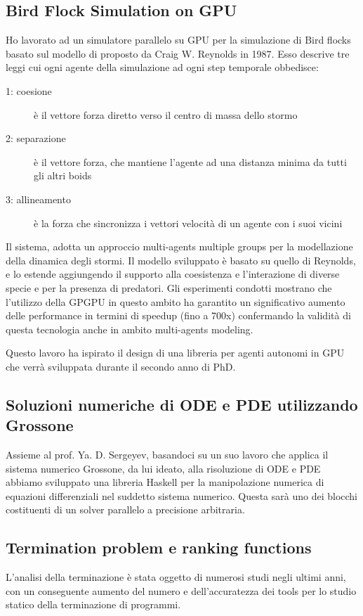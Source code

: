 \documentclass[a4paper]{article}
\begin{document}
  \subsection{Bird Flock Simulation on GPU}
  Ho lavorato ad un simulatore parallelo su GPU per la simulazione di Bird
  flocks basato sul modello di proposto da Craig W. Reynolds in 1987. Esso
  descrive tre leggi cui ogni agente della simulazione ad ogni step
  temporale obbedisce:
  \begin{description}
    \item[1: coesione] è il vettore forza diretto verso il centro di massa dello
    stormo 
    \item [2: separazione]  è il vettore forza, che mantiene l'agente ad una
    distanza minima da tutti gli altri boids
    \item [3: allineamento] è la forza che sincronizza i vettori velocità di un
    agente con i suoi vicini
  \end{description}
  
  Il sistema, adotta un approccio multi-agents multiple
  groups per la modellazione della dinamica degli stormi. Il modello sviluppato
  è basato su quello di Reynolds, e lo estende aggiungendo il supporto alla
  coesistenza e l'interazione di diverse specie e per la presenza di predatori.
Gli esperimenti condotti mostrano che l'utilizzo della GPGPU in questo ambito ha
garantito un significativo aumento delle performance in termini di speedup
(fino a 700x) confermando la validità di questa tecnologia anche in ambito
multi-agents modeling. 

Questo lavoro ha ispirato il design di una libreria per
agenti autonomi in GPU che verrà sviluppata durante il secondo anno di PhD.
  
 	\subsection{Soluzioni numeriche di ODE e PDE utilizzando Grossone}
  	Assieme al prof. Ya. D. Sergeyev, basandoci su un suo lavoro che applica il
  	sistema numerico Grossone, da lui ideato, alla risoluzione di ODE e PDE
  	abbiamo sviluppato una libreria Haskell per la manipolazione numerica di
  	equazioni differenziali nel suddetto sistema numerico. Questa sarà uno dei
  	blocchi costituenti di un solver parallelo a precisione arbitraria.
  	

  
  \subsection{Termination problem e ranking functions}
  L'analisi della terminazione è stata oggetto di numerosi studi negli ultimi
  anni, con un conseguente aumento del numero e dell'accuratezza dei tools per
  lo studio statico della terminazione di programmi.
  
\end{document}
